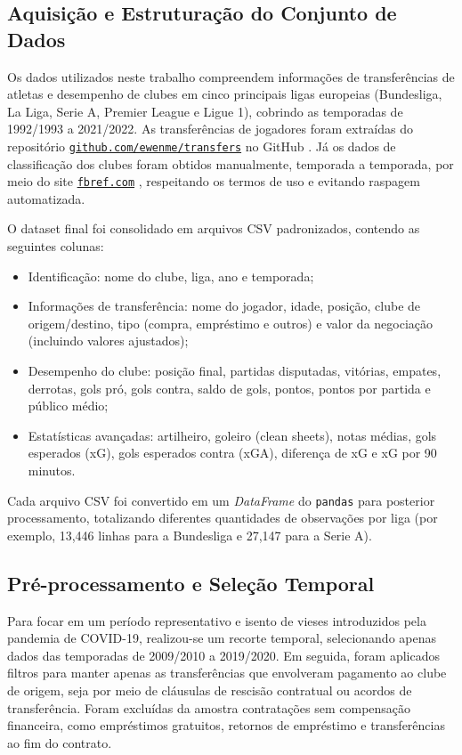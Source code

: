 \documentclass[a4paper]{article}
\theoremstyle{plain}
\theoremstyle{definition}
\begin{document}
\subsection{Aquisição e Estruturação do Conjunto de Dados}
Os dados utilizados neste trabalho compreendem informações de transferências de atletas e desempenho de clubes em cinco principais ligas europeias (Bundesliga, La Liga, Serie A, Premier League e Ligue 1), cobrindo as temporadas de 1992/1993 a 2021/2022. As transferências de jogadores foram extraídas do repositório \href{https://github.com/ewenme/transfers}{\texttt{github.com/ewenme/transfers}} no GitHub \cite{ewenme_transfers}. Já os dados de classificação dos clubes foram obtidos manualmente, temporada a temporada, por meio do site \href{https://fbref.com}{\texttt{fbref.com}} \cite{fbref}, respeitando os termos de uso e evitando raspagem automatizada.

O dataset final foi consolidado em arquivos CSV padronizados, contendo as seguintes colunas:
\begin{itemize}
\item Identificação: nome do clube, liga, ano e temporada;
\item Informações de transferência: nome do jogador, idade, posição, clube de origem/destino, tipo (compra, empréstimo e outros) e valor da negociação (incluindo valores ajustados);
\item Desempenho do clube: posição final, partidas disputadas, vitórias, empates, derrotas, gols pró, gols contra, saldo de gols, pontos, pontos por partida e público médio;
\item Estatísticas avançadas: artilheiro, goleiro (clean sheets), notas médias, gols esperados (xG), gols esperados contra (xGA), diferença de xG e xG por 90 minutos.
\end{itemize}
Cada arquivo CSV foi convertido em um \emph{DataFrame} do \texttt{pandas} para posterior processamento, totalizando diferentes quantidades de observações por liga (por exemplo, 13,446 linhas para a Bundesliga e 27,147 para a Serie A).

\subsection{Pré-processamento e Seleção Temporal}
Para focar em um período representativo e isento de vieses introduzidos pela pandemia de COVID-19, realizou-se um recorte temporal, selecionando apenas dados das temporadas de 2009/2010 a 2019/2020. Em seguida, foram aplicados filtros para manter apenas as transferências que envolveram pagamento ao clube de origem, seja por meio de cláusulas de rescisão contratual ou acordos de transferência. Foram excluídas da amostra contratações sem compensação financeira, como empréstimos gratuitos, retornos de empréstimo e transferências ao fim do contrato.
\end{document}
